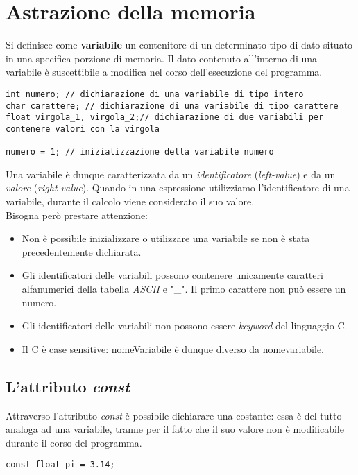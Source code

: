 \section{Astrazione della memoria}
Si definisce come \textbf{variabile} un contenitore di un determinato tipo di dato situato in una specifica porzione di memoria. Il dato contenuto all'interno di una variabile è suscettibile a modifica nel corso dell'esecuzione del programma.
\begin{lstlisting}[title={Dichiarazione di variabili}]
int numero; // dichiarazione di una variabile di tipo intero
char carattere; // dichiarazione di una variabile di tipo carattere
float virgola_1, virgola_2;// dichiarazione di due variabili per contenere valori con la virgola

numero = 1; // inizializzazione della variabile numero
\end{lstlisting}
Una variabile è dunque caratterizzata da un \textit{identificatore} (\textit{left-value}) e da un \textit{valore} (\textit{right-value}). Quando in una espressione utilizziamo l'identificatore di una variabile, durante il calcolo viene considerato il suo valore.\\
Bisogna però prestare attenzione:
\begin{itemize}[noitemsep]
	\item Non è possibile inizializzare o utilizzare una variabile se non è stata precedentemente dichiarata.
	\item Gli identificatori delle variabili possono contenere unicamente caratteri alfanumerici della tabella \textit{ASCII} e "\_". Il primo carattere non può essere un numero.
	\item Gli identificatori delle variabili non possono essere \textit{keyword} del linguaggio C.
	\item Il C è case sensitive: \colorbox{light-gray}{nomeVariabile} è dunque diverso da \colorbox{light-gray}{nomevariabile}.
\end{itemize}

\subsection{L'attributo \textit{const}}
Attraverso l'attributo \textit{const} è possibile dichiarare una costante: essa è del tutto analoga ad una variabile, tranne per il fatto che il suo valore non è modificabile durante il corso del programma.
\begin{lstlisting}[title={Dichiarazione di una costante}]
const float pi = 3.14;
\end{lstlisting}

